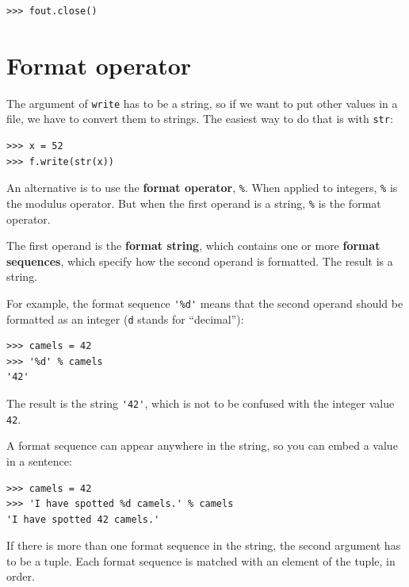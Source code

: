 \documentclass[10pt]{book}
\begin{document}
{\beforeverb
\begin{verbatim}
>>> fout.close()
\end{verbatim}
\afterverb
%



\section{Format operator}


The argument of {\tt write} has to be a string, so if we want
to put other values in a file, we have to convert them to
strings.  The easiest way to do that is with {\tt str}:

\beforeverb
\begin{verbatim}
>>> x = 52
>>> f.write(str(x))
\end{verbatim}
\afterverb
%
An alternative is to use the {\bf format operator}, {\tt \%}.  When
applied to integers, {\tt \%} is the modulus operator.  But
when the first operand is a string, {\tt \%} is the format operator.


The first operand is the {\bf format string}, which contains
one or more {\bf format sequences}, which
specify how
the second operand is formatted.  The result is a string.


For example, the format sequence \verb"'%d'" means that
the second operand should be formatted as an
integer ({\tt d} stands for ``decimal''):

\beforeverb
\begin{verbatim}
>>> camels = 42
>>> '%d' % camels
'42'
\end{verbatim}
\afterverb
%
The result is the string \verb"'42'", which is not to be confused
with the integer value {\tt 42}.

A format sequence can appear anywhere in the string,
so you can embed a value in a sentence:

\beforeverb
\begin{verbatim}
>>> camels = 42
>>> 'I have spotted %d camels.' % camels
'I have spotted 42 camels.'
\end{verbatim}
\afterverb
%
If there is more than one format sequence in the string,
the second argument has to be a tuple.  Each format sequence is
matched with an element of the tuple, in order.

}
\end{document}
